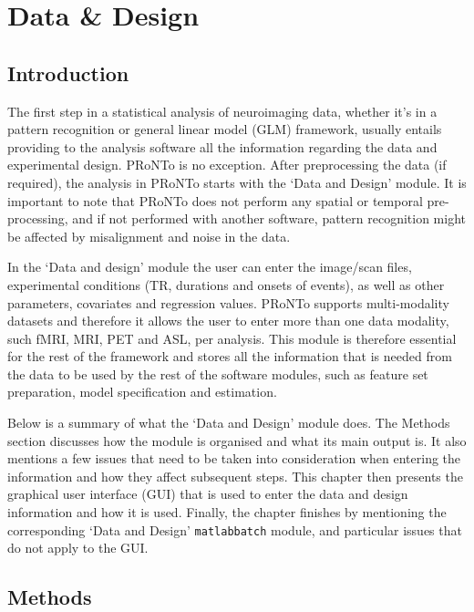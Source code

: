 %

\chapter{Data \& Design}
\label{chap:DataDesign}
\minitoc

\section{Introduction}

The first step in a statistical analysis of neuroimaging data,  whether it's in a pattern recognition or general linear model (GLM) framework, usually entails providing to the analysis software all the information regarding the data and experimental design. PRoNTo is no exception. After preprocessing the data (if required), the analysis in PRoNTo starts with the `Data and Design' module. It is important to note that PRoNTo does not perform any spatial or temporal pre-processing, and if not performed with another software, pattern recognition might be affected by misalignment and noise in the data. 

In the `Data and design' module the user can enter the image/scan files, experimental conditions (TR, durations and onsets of events), as well as other parameters, covariates and regression values. PRoNTo supports multi-modality datasets and therefore it allows the user to enter more than one data modality, such fMRI, MRI, PET and ASL, per analysis. This module is therefore essential for the rest of the framework and stores all the information that is needed from the data to be used by the rest of the software modules, such as feature set preparation, model specification and estimation. 

Below is a summary of what the `Data and Design' module does. The Methods section discusses how the module is organised and what its main output is. It also mentions a few issues that need to be taken into consideration when entering the information and how they affect subsequent steps. This chapter then presents the graphical user interface (GUI) that is used to enter the data and design information and how it is used. Finally, the chapter finishes by mentioning the corresponding `Data and Design' {\tt matlabbatch} module, and particular issues that do not apply to the GUI.

\section{Methods}

